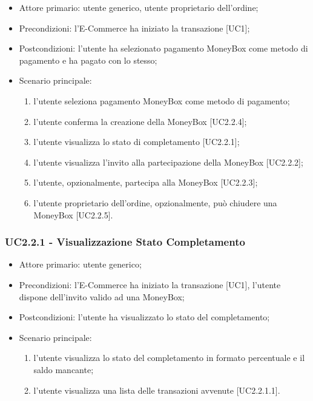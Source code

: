     \begin{itemize}
    \item Attore primario: utente generico, utente proprietario dell'ordine;
    \item Precondizioni: l'E-Commerce ha iniziato la transazione [UC1];
    \item Postcondizioni: l'utente ha selezionato pagamento MoneyBox come metodo di pagamento e ha pagato con lo stesso;
    \item Scenario principale:
    \begin{enumerate}
        \item l'utente seleziona pagamento MoneyBox come metodo di pagamento;
        \item l'utente conferma la creazione della MoneyBox [UC2.2.4];
        \item l'utente visualizza lo stato di completamento [UC2.2.1];
        \item l'utente visualizza l'invito alla partecipazione della MoneyBox [UC2.2.2];
        \item l'utente, opzionalmente, partecipa alla MoneyBox [UC2.2.3];
        \item l'utente proprietario dell'ordine, opzionalmente, può chiudere una MoneyBox [UC2.2.5].
        \end{enumerate}
    \end{itemize}

    \subsubsection{UC2.2.1 - Visualizzazione Stato Completamento}

    \begin{itemize}
    \item Attore primario: utente generico;
    \item Precondizioni: l'E-Commerce ha iniziato la transazione [UC1], l'utente dispone dell'invito valido ad una MoneyBox;
    \item Postcondizioni: l'utente ha visualizzato lo stato del completamento;
    \item Scenario principale:
    \begin{enumerate}
        \item l'utente visualizza lo stato del completamento in formato percentuale e il saldo mancante;
        \item l'utente visualizza una lista delle transazioni avvenute [UC2.2.1.1].
        \end{enumerate}
    \end{itemize}

